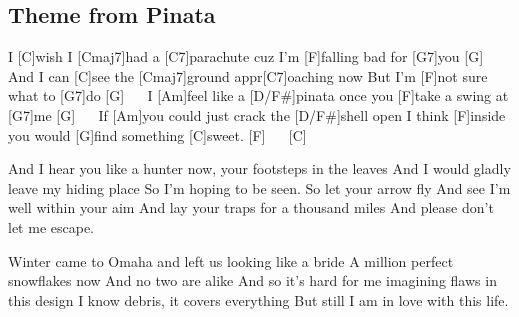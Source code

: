 \subsection*{Theme from Pinata   }
\begin{guitar}
I [C]wish I [Cmaj7]had a [C7]parachute cuz I'm [F]falling bad for [G7]you [G] $\quad$
And I can [C]see the [Cmaj7]ground appr[C7]oaching now
But I'm [F]not sure what to [G7]do [G] $\quad$
I [Am]feel like a [D/F#]pinata once you [F]take a swing at [G7]me [G] $\quad$
If [Am]you could just crack the [D/F#]shell open
I think [F]inside you would [G]find something [C]sweet. [F] $\quad$ [C]

And I hear you like a hunter now, your footsteps in the leaves
And I would gladly leave my hiding place
So I'm hoping to be seen.
So let your arrow fly
And see I'm well within your aim
And lay your traps for a thousand miles
And please don't let me escape.

Winter came to Omaha and left us looking like a bride
A million perfect snowflakes now
And no two are alike
And so it's hard for me imagining flaws in this design
I know debris, it covers everything
But still I am in love with this life. 
\end{guitar}
